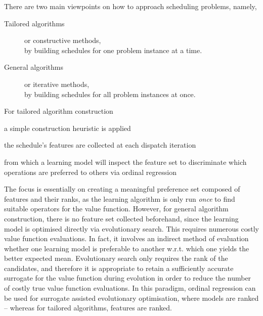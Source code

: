 \noindent There are two main viewpoints on how to approach scheduling problems, 
namely,
\begin{description}
  \item[Tailored algorithms] or constructive methods, \\
  by building schedules for one problem instance at a time.
  \item[General algorithms] or iterative methods, \\ 
  by building schedules for all problem instances at once.
\end{description}
For tailored algorithm construction
\begin{enumerate*} %
  \item a simple construction heuristic is applied 
  \item the schedule's features are collected at each dispatch iteration
  \item from which a learning model will inspect the feature set to 
  discriminate which operations are preferred to others via ordinal regression 
\end{enumerate*}
The focus is essentially on creating a meaningful preference set composed of 
features and their ranks, as the learning algorithm is only run \emph{once} to 
find suitable operators for the value function. 
However, for general algorithm construction, there is no feature set collected 
beforehand, since the learning model is optimised directly via evolutionary 
search. This requires numerous costly value function evaluations. 
In fact, it involves an indirect method of evaluation whether one learning 
model is preferable to another w.r.t. which one yields the better expected 
mean. 
Evolutionary search only requires the rank of the candidates, and therefore it 
is appropriate to retain a sufficiently accurate surrogate for the value 
function during evolution in order to reduce the number of costly true value 
function evaluations. 
In this paradigm, ordinal regression can be used for surrogate assisted 
evolutionary optimisation, where models are ranked -- whereas for tailored 
algorithms, features are ranked. 

